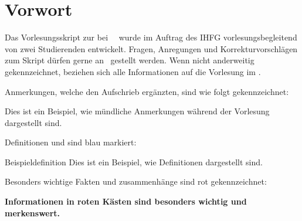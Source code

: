 \thispagestyle{vorwort}
\section*{Vorwort}
Das Vorlesungsskript zur \emph{\LectureTitle} bei \LecturerTitle~\LecturerName~wurde im Auftrag des IHFG vorlesungsbegleitend von zwei Studierenden entwickelt. Fragen, Anregungen und Korrekturvorschlägen zum Skript dürfen gerne an \ContactEmail~gestellt werden. Wenn nicht anderweitig gekennzeichnet, beziehen sich alle Informationen auf die Vorlesung im \LectureSemester.\par

Anmerkungen, welche den Aufschrieb ergänzten, sind wie folgt gekennzeichnet:
\begin{verbal}
    Dies ist ein Beispiel, wie mündliche Anmerkungen während der Vorlesung dargestellt sind.
\end{verbal}

Definitionen und  sind blau markiert:
\begin{definition}{Beispieldefinition}
    Dies ist ein Beispiel, wie Definitionen dargestellt sind.
\end{definition}

Besonders wichtige Fakten und zusammenhänge sind rot gekennzeichnet:
\begin{important}
    \textbf{Informationen in roten Kästen sind besonders wichtig und merkenswert.}
\end{important}